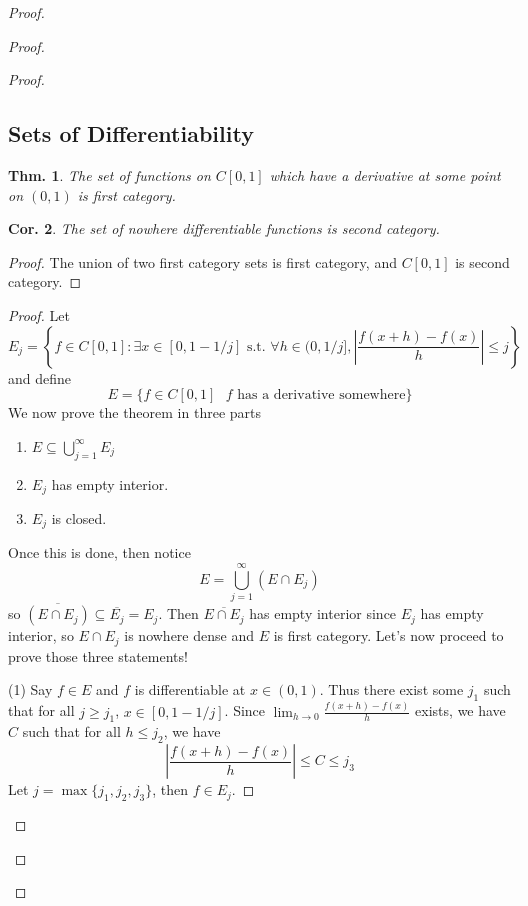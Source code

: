 \documentclass[12pt, a4paper]{book}
\newtheorem{theorem}{Thm.}[section]
\newtheorem{corollary}[theorem]{Cor.}
\theoremstyle{nonumberplain}
\newtheorem{proof}{Proof}
\begin{document}
\begin{proof}
\begin{proof}
\begin{proof}
\subsection{Sets of Differentiability}
\begin{theorem}
    The set of functions on $C[0,1]$ which have a derivative at some point on $(0,1)$ is first category.
\end{theorem}
\begin{corollary}
    The set of nowhere differentiable functions is second category.
\end{corollary}
\begin{proof}
    The union of two first category sets is first category, and $C[0,1]$ is second category.
\end{proof}
\begin{proof}
    Let
    \[E_j = \left\{f\in C[0,1]:\exists x\in[0,1-1/j]\text{ s.t. }\forall h\in(0,1/j],\left\lvert\frac{f(x+h)-f(x)}{h}\right\rvert\leq j\right\}\]
    and define
    \[E=\{f\in C[0,1]\text{ $f$ has a derivative somewhere}\}\]
    We now prove the theorem in three parts
    \begin{enumerate}
        \item $E\subseteq\bigcup_{j=1}^\infty E_j$
        \item $E_j$ has empty interior.
        \item $E_j$ is closed.
    \end{enumerate}
    Once this is done, then notice
    \[E=\bigcup\limits_{j=1}^\infty (E\cap E_j)\]
    so $\overline{(E\cap E_j)}\subseteq\overline{E_j}=E_j$.
    Then $\overline{E\cap E_j}$ has empty interior since $E_j$ has empty interior, so $E\cap E_j$ is nowhere dense and $E$ is first category.
    Let's now proceed to prove those three statements!

    (1) Say $f\in E$ and $f$ is differentiable at $x\in(0,1)$.
    Thus there exist some $j_1$ such that for all $j\geq j_1$, $x\in[0,1-1/j]$.
    Since $\lim_{h\to 0}\frac{f(x+h)-f(x)}{h}$ exists, we have $C$ such that for all $h\leq j_2$, we have
    \[\left\lvert\frac{f(x+h)-f(x)}{h}\right\rvert\leq C\leq j_3\]
    Let $j=\max\{j_1,j_2,j_3\}$, then $f\in E_j$.


\end{proof}
\end{proof}
\end{proof}
\end{proof}
\end{document}
